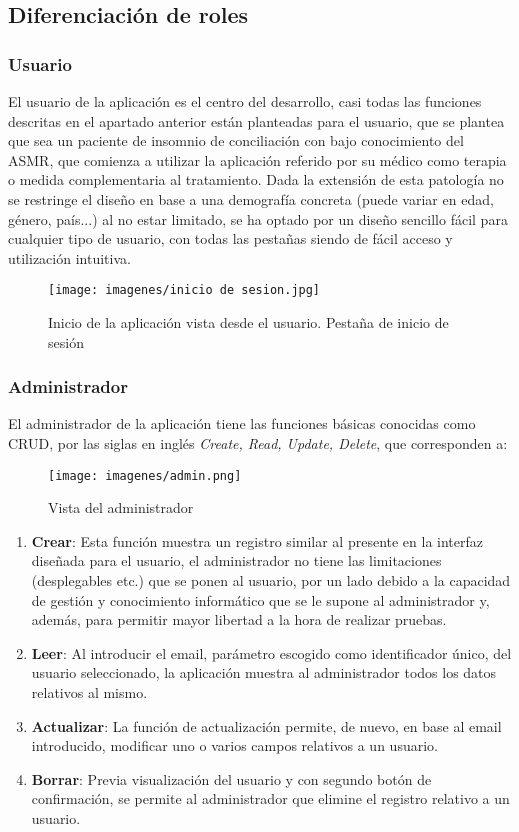 \documentclass[a4paper,12pt,twoside]{memoir}
\begin{document}
\subsection{Diferenciación de roles}
\subsubsection{Usuario}
El usuario de la aplicación es el centro del desarrollo, casi todas las funciones descritas en el apartado anterior están planteadas para el usuario, que se plantea que sea un paciente de insomnio de conciliación con bajo conocimiento del ASMR, que comienza a utilizar la aplicación referido por su médico como terapia o medida complementaria al tratamiento. Dada la extensión de esta patología no se restringe el diseño en base a una demografía concreta (puede variar en edad, género, país...) al no estar limitado, se ha optado por un diseño sencillo fácil para cualquier tipo de usuario, con todas las pestañas siendo de fácil acceso y utilización intuitiva.
\begin{figure}
    \centering
    \texttt{[image: imagenes/inicio de sesion.jpg]}
    \caption{Inicio de la aplicación vista desde el usuario. Pestaña de inicio de sesión}
    \label{fig:enter-label}
\end{figure}

\subsubsection{Administrador}
El administrador de la aplicación tiene las funciones básicas conocidas como CRUD, por las siglas en inglés \textit{Create, Read, Update, Delete}, que corresponden a:
\begin{figure}
    \centering
    \texttt{[image: imagenes/admin.png]}
    \caption{Vista del administrador}
    \label{fig:enter-label}
\end{figure}
\begin{enumerate}
    \item \textbf{Crear}: Esta función muestra un registro similar al presente en la interfaz diseñada para el usuario, el administrador no tiene las limitaciones (desplegables etc.) que se ponen al usuario, por un lado debido a la capacidad de gestión y conocimiento informático que se le supone al administrador y, además, para permitir mayor libertad a la hora de realizar pruebas.
    \item \textbf{Leer}: Al introducir el email, parámetro escogido como identificador único, del usuario seleccionado, la aplicación muestra al administrador todos los datos relativos al mismo.
    \item \textbf{Actualizar}: La función de actualización permite, de nuevo, en base al email introducido, modificar uno o varios campos relativos a un usuario.
    \item \textbf{Borrar}: Previa visualización del usuario y con segundo botón de confirmación, se permite al administrador que elimine el registro relativo a un usuario.
\end{enumerate}
\end{document}
